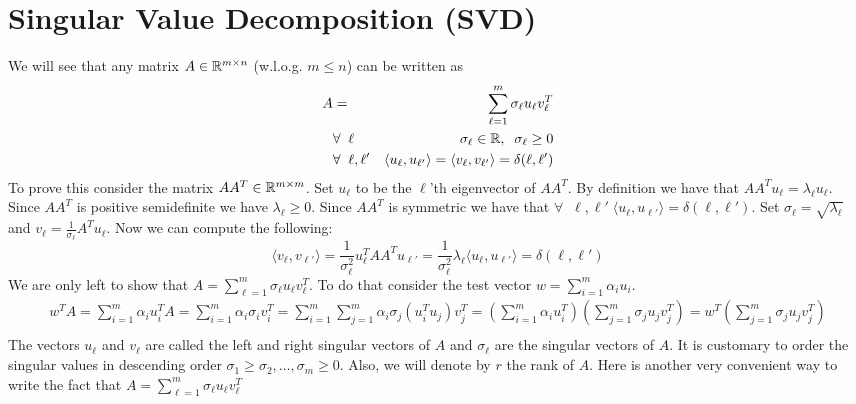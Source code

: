 \documentclass{article}
\begin{document}



\section{Singular Value Decomposition (SVD)}


\noindent We will see that any matrix $A \in {\mathbb{R}}^{m \times n}$ (w.l.o.g. $m \le n$) can be written as 
\begin{eqnarray}
A &=& \sum_{\ell=1}^{m} \sigma_{\ell} u_{\ell} v_{\ell}^{T}\\
&\forall \;\; \ell& \sigma_\ell \in {\mathbb{R}},  \;\; \sigma_\ell \ge 0\\
&\forall \;\; \ell, \ell'&  \langle u_{\ell}, u_{\ell'} \rangle=  \langle v_{\ell}, v_{\ell'} \rangle = \delta(\ell,\ell')
\end{eqnarray}
%
To prove this consider the matrix $AA^{T} \in {\mathbb{R}}^{m\times m}$.
Set $u_\ell$ to be the $\ell$'th eigenvector of $AA^{T}$.
By definition we have that $AA^{T}u_\ell = \lambda_\ell u_\ell$.
Since $AA^{T}$ is positive semidefinite we have $\lambda_\ell \ge 0$.
Since $AA^{T}$ is symmetric we have that $\forall \;\; \ell, \ell' \;  \langle u_{\ell}, u_{\ell'} \rangle = \delta(\ell,\ell')$.
Set $\sigma_\ell = \sqrt{\lambda_\ell}$ and $v_\ell = \frac{1}{\sigma_\ell}A^{T}u_{\ell}$.
Now we can compute the following:
\[
\langle v_{\ell}, v_{\ell'} \rangle =  \frac{1}{\sigma^{2}_\ell}u_{\ell}^{T}AA^{T}u_{\ell'} =   \frac{1}{\sigma_{\ell}^{2}}\lambda_\ell  \langle u_{\ell}, u_{\ell'} \rangle = \delta(\ell,\ell')
\]
%
We are only left to show that $A = \sum_{\ell=1}^{m} \sigma_{\ell} u_{\ell} v_{\ell}^{T}$.
To do that consider the test vector $w = \sum_{i=1}^{m} \alpha_i u_i$.
\begin{eqnarray*}
w^TA =  \sum_{i=1}^{m} \alpha_i u_i^TA = \sum_{i=1}^{m} \alpha_i \sigma_i v_i^T = \sum_{i=1}^{m}\sum_{j=1}^{m}\alpha_i \sigma_j (u_i^Tu_j) v_j^T = (\sum_{i=1}^{m}\alpha_i u_i^T)(\sum_{j=1}^{m}\sigma_j u_j v_j^T)  = w^T(\sum_{j=1}^{m}\sigma_j u_j v_j^T)\\
\end{eqnarray*}
%
The vectors $u_\ell$ and $v_{\ell}$ are called the left and right singular vectors of $A$ and $\sigma_\ell$ are the singular vectors of $A$.
It is customary to order the singular values in descending order $\sigma_1 \ge \sigma_2, \ldots , \sigma_m \ge 0$.
Also, we will denote by $r$ the rank of $A$. 
Here is another very convenient way to write the fact that $A = \sum_{\ell=1}^{m} \sigma_{\ell} u_{\ell} v_{\ell}^{T}$
\end{document}
